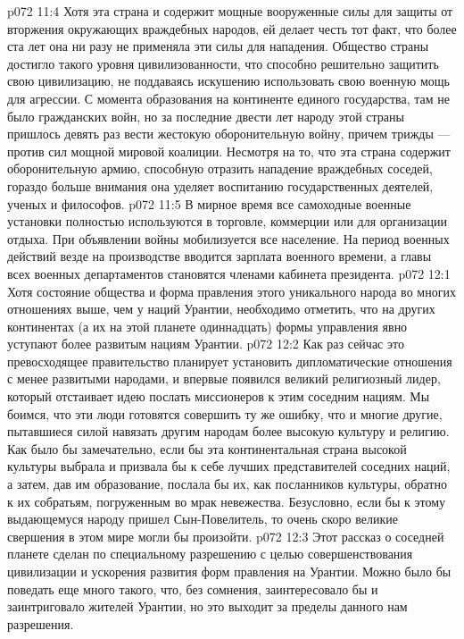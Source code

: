 \vs p072 11:4 \pc Хотя эта страна и содержит мощные вооруженные силы для защиты от вторжения окружающих враждебных народов, ей делает честь тот факт, что более ста лет она ни разу не применяла эти силы для нападения. Общество страны достигло такого уровня цивилизованности, что способно решительно защитить свою цивилизацию, не поддаваясь искушению использовать свою военную мощь для агрессии. С момента образования на континенте единого государства, там не было гражданских войн, но за последние двести лет народу этой страны пришлось девять раз вести жестокую оборонительную войну, причем трижды --- против сил мощной мировой коалиции. Несмотря на то, что эта страна содержит оборонительную армию, способную отразить нападение враждебных соседей, гораздо больше внимания она уделяет воспитанию государственных деятелей, ученых и философов.
\vs p072 11:5 В мирное время все самоходные военные установки полностью используются в торговле, коммерции или для организации отдыха. При объявлении войны мобилизуется все население. На период военных действий везде на производстве вводится зарплата военного времени, а главы всех военных департаментов становятся членами кабинета президента.
\vs p072 12:1 Хотя состояние общества и форма правления этого уникального народа во многих отношениях выше, чем у наций Урантии, необходимо отметить, что на других континентах (а их на этой планете одиннадцать) формы управления явно уступают более развитым нациям Урантии.
\vs p072 12:2 Как раз сейчас это превосходящее правительство планирует установить дипломатические отношения с менее развитыми народами, и впервые появился великий религиозный лидер, который отстаивает идею послать миссионеров к этим соседним нациям. Мы боимся, что эти люди готовятся совершить ту же ошибку, что и многие другие, пытавшиеся силой навязать другим народам более высокую культуру и религию. Как было бы замечательно, если бы эта континентальная страна высокой культуры выбрала и призвала бы к себе лучших представителей соседних наций, а затем, дав им образование, послала бы их, как посланников культуры, обратно к их собратьям, погруженным во мрак невежества. Безусловно, если бы к этому выдающемуся народу пришел Сын\hyp{}Повелитель, то очень скоро великие свершения в этом мире могли бы произойти.
\vs p072 12:3 \pc Этот рассказ о соседней планете сделан по специальному разрешению с целью совершенствования цивилизации и ускорения развития форм правления на Урантии. Можно было бы поведать еще много такого, что, без сомнения, заинтересовало бы и заинтриговало жителей Урантии, но это выходит за пределы данного нам разрешения.
